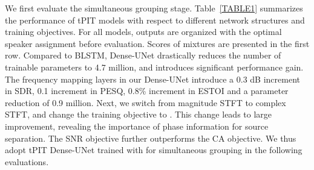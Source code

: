 \documentclass[journal]{IEEEtran}
\begin{document}
We first evaluate the simultaneous grouping stage.
Table~\ref{TABLE1} summarizes the performance of tPIT models with respect to different network structures and training objectives.
For all models, outputs are organized with the optimal speaker assignment before evaluation.
Scores of mixtures are presented in the first row. 
Compared to BLSTM, Dense-UNet drastically reduces the number of trainable parameters to 4.7 million, and introduces significant performance gain.
The frequency mapping layers in our Dense-UNet introduce a 0.3 dB increment in SDR, 0.1 increment in PESQ, 0.8\% increment in ESTOI and a parameter reduction of 0.9 million. 
Next, we switch from magnitude STFT to complex STFT, and change the training objective to .
This change leads to large improvement, revealing the importance of phase information for source separation.
The SNR objective further outperforms the CA objective. 
We thus adopt tPIT Dense-UNet trained with  for simultaneous grouping in the following evaluations.

 \begin{table}[!t]
\renewcommand{\arraystretch}{1.2}
    \caption{SDR, PESQ and ESTOI for tPIT and uPIT based Dense-UNet trained with SNR objectives.}
    \label{TABLE2}
    \centering

    \end{table}

\captionsetup[subfloat]{captionskip=-0.7pt}
\end{document}
